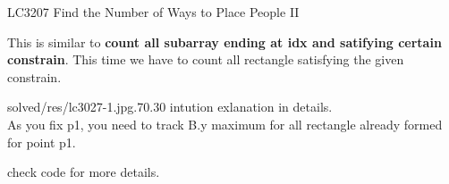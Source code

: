 \begin{problem}{LC3207 Find the Number of Ways to Place People II}


\end{problem}


\begin{fullwidth}

\begin{solution}

    This is similar to \textbf{count all subarray ending at idx and satifying certain constrain}. This time we have to count all rectangle satisfying the given constrain.

    \begin{lfigure}{solved/res/lc3027-1.jpg}{.70}{.30}
        intution exlanation in details.\\
        As you fix p1, you need to track B.y maximum for all rectangle already formed for point p1.

        check code for more details.
    \end{lfigure}
    
\end{solution}


\end{fullwidth}